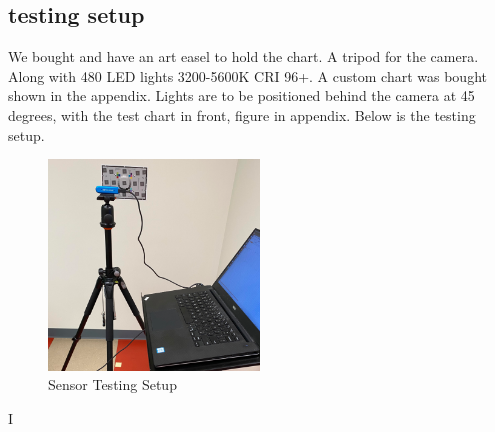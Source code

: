 \subsection{testing setup}
We bought and have an art easel to hold the chart. A tripod for the camera. Along with 480 LED lights 3200-5600K CRI 96+. A custom chart was bought shown in the appendix. Lights are to be positioned behind the camera at 45 degrees, with the test chart in front, figure in appendix. Below is the testing setup.
\begin{figure}[h]
	\caption{Sensor Testing Setup}
	\centering
	\includegraphics[width=0.5\textwidth, angle=0]{images/sensor_testing.png}
\end{figure}
I
